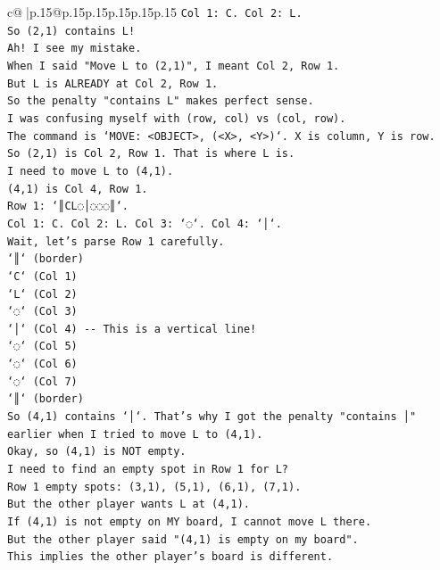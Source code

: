 \documentclass{article}
\begin{document}
{\begin{supertabular}{c@{$\;$}|p{.15\linewidth}@{}p{.15\linewidth}p{.15\linewidth}p{.15\linewidth}p{.15\linewidth}p{.15\linewidth}}
{{{\texttt{Col 1: C. Col 2: L.} \\
\texttt{So (2,1) contains L!} \\
\texttt{Ah! I see my mistake.} \\
\texttt{When I said "Move L to (2,1)", I meant Col 2, Row 1.} \\
\texttt{But L is ALREADY at Col 2, Row 1.} \\
\texttt{So the penalty "contains L" makes perfect sense.} \\
\texttt{I was confusing myself with (row, col) vs (col, row).} \\
\texttt{The command is `MOVE: <OBJECT>, (<X>, <Y>)`. X is column, Y is row.} \\
\texttt{So (2,1) is Col 2, Row 1. That is where L is.} \\
\texttt{I need to move L to (4,1).} \\
\texttt{(4,1) is Col 4, Row 1.} \\
\texttt{Row 1: `║CL◌│◌◌◌║`.} \\
\texttt{Col 1: C. Col 2: L. Col 3: `◌`. Col 4: `│`.} \\
\texttt{Wait, let's parse Row 1 carefully.} \\
\texttt{`║` (border)} \\
\texttt{`C` (Col 1)} \\
\texttt{`L` (Col 2)} \\
\texttt{`◌` (Col 3)} \\
\texttt{`│` (Col 4) {-}{-} This is a vertical line!} \\
\texttt{`◌` (Col 5)} \\
\texttt{`◌` (Col 6)} \\
\texttt{`◌` (Col 7)} \\
\texttt{`║` (border)} \\
\texttt{So (4,1) contains `│`. That's why I got the penalty "contains │" earlier when I tried to move L to (4,1).} \\
\texttt{Okay, so (4,1) is NOT empty.} \\
\texttt{I need to find an empty spot in Row 1 for L?} \\
\texttt{Row 1 empty spots: (3,1), (5,1), (6,1), (7,1).} \\
\texttt{But the other player wants L at (4,1).} \\
\texttt{If (4,1) is not empty on MY board, I cannot move L there.} \\
\texttt{But the other player said "(4,1) is empty on my board".} \\
\texttt{This implies the other player's board is different.} \\
}}}
\end{supertabular}}
\end{document}
